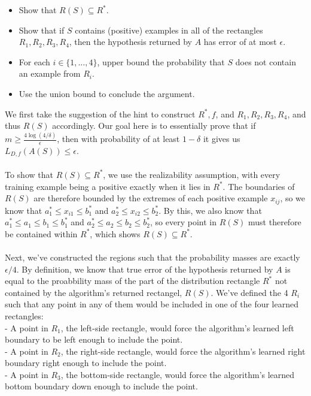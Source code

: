 \documentclass{article}
\begin{document}
{\begin{itemize}
  \item Show that \(R(S) \subseteq R^*\).
  \item Show that if \(S\) contains (positive) examples in all of the rectangles \(R_1, R_2, R_3, R_4\), then the hypothesis returned by \(A\) has error of at most \(\epsilon\).
  \item For each \(i \in \{1, \dots, 4\}\), upper bound the probability that \(S\) does not contain an example from \(R_i\).
  \item Use the union bound to conclude the argument.
\end{itemize}
We first take the suggestion of the hint to construct \(R^*, f\), and \(R_1, R_2, R_3, R_4\), and thus \(R(S)\) accordingly. Our goal here is to essentially prove that if \(m \geq \frac{4 \log (4 / \delta)}{\epsilon}\), then with probability of at least \(1 - \delta\) it gives us \(L_{D, f} (A(S)) \leq \epsilon \). \\ \\
To show that \(R(S) \subseteq R^*\), we use the realizability assumption, with every training example being a positive exactly when it lies in \(R^*\). The boundaries of \(R(S)\) are therefore bounded by the extremes of each positive example \(x_{ij}\), so we know that \(a_1^* \leq x_{i1} \leq b_1^*\) and \(a_2^* \leq x_{i2} \leq b_2^*\). By this, we also know that \(a_1^* \leq a_1 \leq b_1 \leq b_1^*\) and \(a_2^* \leq a_2 \leq b_2 \leq b_2^*\), so every point in \(R(S)\) must therefore be contained within \(R^*\), which shows \(R(S) \subseteq R^*\). \\ \\
Next, we've constructed the regions such that the probability masses are exactly \(\epsilon / 4\). By definition, we know that true error of the hypothesis returned by \(A\) is equal to the proabbility mass of the part of the distribution rectangle \(R^*\) not contained by the algorithm's returned rectangel, \(R(S)\). We've defined the 4 \(R_i\) such that any point in any of them would be included in one of the four learned rectangles: \\
- A point in \(R_1\), the left-side rectangle, would force the algorithm's learned left boundary to be left enough to include the point. \\
- A point in \(R_2\), the right-side rectangle, would force the algorithm's learned right boundary right enough to include the point. \\
- A point in \(R_3\), the bottom-side rectangle, would force the algorithm's learned bottom boundary down enough to include the point. \\
}
\end{document}
